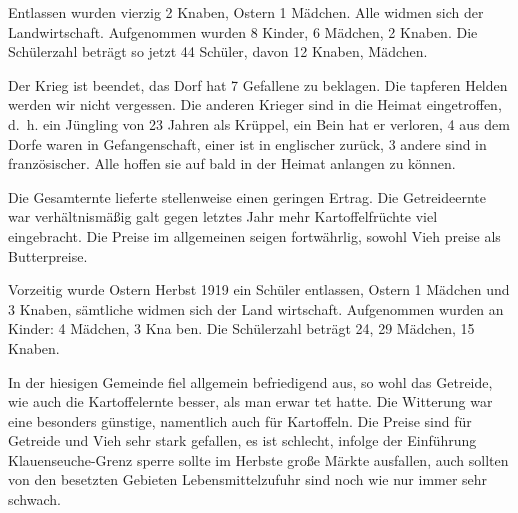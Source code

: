

\pstart
Entlassen wurden vierzig 2 Knaben, Ostern 1 Mädchen. Alle widmen sich\ob
der Landwirtschaft. Aufgenommen wurden 8 Kinder, 6 Mädchen, 2\ob
Knaben. Die Schülerzahl beträgt so jetzt 44 Schüler, davon 12 Knaben, Mädchen.

\pend
{}
\pstart

Der Krieg ist beendet, das Dorf hat 7 Gefallene zu beklagen. Die tapferen\ob
Helden werden wir nicht vergessen. Die anderen Krieger sind in die Heimat\ob
eingetroffen, d.\ h. ein Jüngling von 23 Jahren als Krüppel, ein Bein hat er\ob
verloren, 4 aus dem Dorfe waren in Gefangenschaft, einer ist in englischer\ob
zurück, 3 andere sind in französischer. Alle hoffen sie auf bald in der\ob
Heimat anlangen zu können.

\pend
{}
\pstart

Die Gesamternte lieferte stellenweise einen geringen Ertrag. Die Getreideernte\ob
war verhältnismäßig galt gegen letztes Jahr mehr Kartoffelfrüchte viel\ob
eingebracht. Die Preise im allgemeinen seigen fortwährlig, sowohl Vieh\ohb
preise als Butterpreise.

\pend
{}
\pstart

Vorzeitig wurde Ostern Herbst 1919 ein Schüler entlassen, Ostern 1 Mädchen und 3 Knaben, sämtliche widmen sich der Land\ohb
wirtschaft. Aufgenommen wurden an Kinder: 4 Mädchen, 3 Kna\ohb
ben. Die Schülerzahl beträgt 24, 29 Mädchen, 15 Knaben.

\pend
{}
\pstart

In der hiesigen Gemeinde fiel allgemein befriedigend aus, so\ohb
wohl das Getreide, wie auch die\unsicher{} Kartoffelernte besser, als man erwar\ohb
tet hatte. Die Witterung war eine besonders günstige, namentlich\ob
auch für Kartoffeln. Die Preise sind für Getreide und Vieh sehr\ob
stark gefallen, es ist schlecht, infolge der Einführung Klauenseuche-Grenz\ohb
sperre sollte im Herbste große Märkte ausfallen, auch sollten von den\ob
besetzten Gebieten Lebensmittelzufuhr sind noch wie nur immer sehr schwach.
\pend
